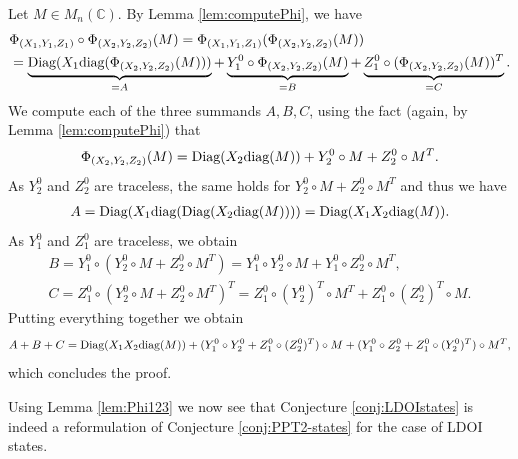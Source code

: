 \documentclass[11pt]{article}
\makeatletter
\newcommand{\C}{\ensuremath{\mathbb{C}}} %
\newcommand{\diag}{\text{\rm diag}}
\newcommand{\Diag}{\text{\rm Diag}}
\theoremstyle{plain}
\renewenvironment{proof}[1][\proofname]{%
  \par
  \pushQED{}%
  \normalfont
  \topsep6\p@\@plus6\p@
  \trivlist
  \item[\hskip\labelsep\itshape #1\@addpunct{.}]%
}{%
  \popQED
  \endtrivlist
}
\makeatother
\begin{document}
\begin{proof}
Let $M\in M_n(\C)$. By Lemma \ref{lem:computePhi},  we have
\begin{align*}
& \Phi_{(X_1,Y_1,Z_1)}\circ \Phi_{(X_2,Y_2,Z_2)} (M) = \Phi_{(X_1,Y_1,Z_1)}(\Phi_{(X_2,Y_2,Z_2)}(M))\\
& = \underbrace{\Diag(X_1 \diag(\Phi_{(X_2,Y_2,Z_2)}(M)))}_{=A} + \underbrace{Y_1^0 \circ \Phi_{(X_2,Y_2,Z_2)}(M)}_{=B}
 + \underbrace{Z_1^0 \circ (\Phi_{(X_2,Y_2,Z_2)}(M))^T}_{=C}.
 \end{align*}
We compute each of the three summands $A,B,C$, using the fact (again, by Lemma \ref{lem:computePhi}) that 
$$\Phi_{(X_2,Y_2,Z_2)}(M)=\Diag(X_2\diag(M))+ Y_2^0\circ M+Z_2^0\circ M^T.$$
As $Y_2^0$ and $Z_2^0$ are traceless, the same holds for $Y_2^0\circ M+Z_2^0\circ M^T$ and thus  we have
    \begin{align*}
        A = \Diag(X_1\diag(\Diag(X_2\diag(M)))) = \Diag(X_1X_2\diag(M)).
    \end{align*}
 As $Y_1^0$ and $Z_1^0$ are traceless, we obtain
     \begin{align*}
        B = Y_1^0\circ(Y_2^{0}\circ M + Z_2^{0}\circ M^T) = Y_1^0\circ Y_2^0\circ M + Y_1^0\circ Z_2^0\circ M^T,\\
        C = Z_1^0\circ(Y_2^{0}\circ M + Z_2^{0}\circ M^T)^T = Z_1^0\circ (Y_2^0)^T\circ M^T + Z_1^0\circ (Z_2^0)^T\circ M.
    \end{align*}
    Putting everything together we obtain $$ A + B + C = \Diag(X_1X_2\diag(M)) + (Y_1^0\circ Y_2^0 + Z_1^0\circ (Z_2^0)^T)\circ M + (Y_1^0\circ Z_2^0 + Z_1^0\circ (Y_2^0)^T)\circ M^T,$$
which concludes the proof.
\end{proof}

Using Lemma \ref{lem:Phi123} we now see that Conjecture \ref{conj:LDOIstates} is indeed a reformulation of Conjecture \ref{conj:PPT2-states} for the case of LDOI states.
\end{document}
